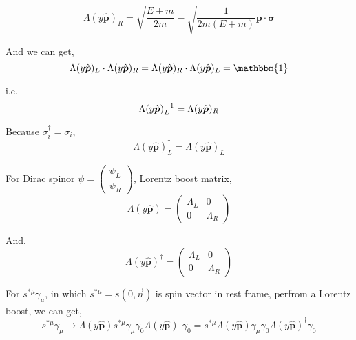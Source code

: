 \documentclass[a4paper]{article}
\begin{document}
\begin{equation}
    \Lambda(y\hat{\boldsymbol{p}})_{R}=\sqrt{\frac{E+m}{2m}}-\sqrt{\frac{1}{2m(E+m)}}\boldsymbol{p}\cdot\boldsymbol{\sigma}
\end{equation}
\par And we can get,
\begin{equation}
    \Lambda(y\hat{\boldsymbol{p}})_{L}\cdot \Lambda(y\hat{\boldsymbol{p}})_{R}=\Lambda(y\hat{\boldsymbol{p}})_{R}\cdot\Lambda(y\hat{\boldsymbol{p}})_{L}=\mathbbm{1}
\end{equation}
\par i.e.
\begin{equation}
       \Lambda(y\hat{\boldsymbol{p}})_{L}^{-1}=\Lambda(y\hat{\boldsymbol{p}})_{R}\\
\end{equation}
\par Because $\sigma^{\dag}_{i}=\sigma_{i}$,
\begin{equation}
    \Lambda(y\hat{\boldsymbol{p}})_{L}^{\dag}=\Lambda(y\hat{\boldsymbol{p}})_{L}
\end{equation}
\par For Dirac spinor $\psi=\begin{pmatrix}
    \psi_{L}\\
    \psi_{R}
\end{pmatrix}$, Lorentz boost matrix,
\begin{equation}
     \Lambda(y\hat{\boldsymbol{p}})=\begin{pmatrix}
          \Lambda_{L} & 0\\
          0 & \Lambda_{R}
     \end{pmatrix}
\end{equation}
\par And,
\begin{equation}
     \Lambda(y\hat{\boldsymbol{p}})^{\dag}=\begin{pmatrix}
          \Lambda_{L} & 0\\
          0 & \Lambda_{R}
     \end{pmatrix}
\end{equation}
\par For $s^{*\mu}\gamma_{\mu}$, in which $s^{*\mu}=s(0,\vec{n})$ is spin vector in rest frame, perfrom a Lorentz boost, we can get,
\begin{equation}
        s^{*\mu}\gamma_{\mu} 
        \to \Lambda(y\hat{\boldsymbol{p}})s^{*\mu}\gamma_{\mu}\gamma_{0}\Lambda(y\hat{\boldsymbol{p}})^{\dag}\gamma_{0}=s^{*\mu}\Lambda(y\hat{\boldsymbol{p}})\gamma_{\mu}\gamma_{0}\Lambda(y\hat{\boldsymbol{p}})^{\dag}\gamma_{0}
\end{equation}
\end{document}
